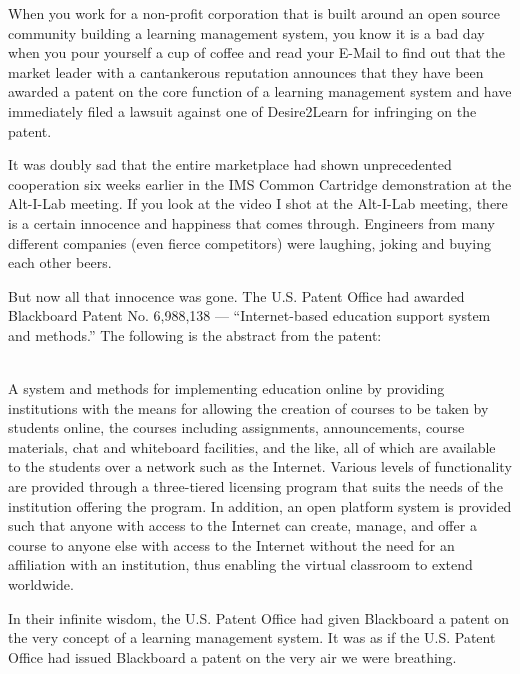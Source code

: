 \documentclass[12pt]{book}
\begin{document}
When you work for a non-profit corporation that is built around an
open source community building a learning management system,
you know it is a bad day when you pour yourself a cup of coffee
and read your E-Mail to find out that the market leader
with a cantankerous reputation announces that they have been
awarded a patent on the core function of a learning management
system and have immediately filed a lawsuit against one of
Desire2Learn for infringing on the patent.

It was doubly sad that the entire marketplace had shown
unprecedented cooperation six weeks earlier in the IMS
Common Cartridge demonstration at the Alt-I-Lab meeting.
If you look at the video I shot at the Alt-I-Lab
meeting, there is a certain innocence and happiness that
comes through.  Engineers from many different companies
(even fierce competitors) were laughing, joking and buying
each other beers.

But now all that innocence was gone. The U.S. Patent Office
had awarded Blackboard Patent No. 6,988,138 --- ``Internet-based education
support system and methods.''  The following is the abstract
from the patent:\\
\\
\begin{sf}
A system and methods for implementing education online by
providing institutions with the means for allowing the creation of
courses to be taken by students online, the courses including
assignments, announcements, course materials, chat and whiteboard
facilities, and the like, all of which are available to the students
over a network such as the Internet. Various levels of functionality
are provided through a three-tiered licensing program that suits the
needs of the institution offering the program. In addition, an open
platform system is provided such that anyone with access to the
Internet can create, manage, and offer a course to anyone else
with access to the Internet without the need for an affiliation
with an institution, thus enabling the virtual classroom to extend worldwide.\\
\end{sf}

In their infinite wisdom, the U.S. Patent Office had given Blackboard a
patent on the very concept of a learning management system.
It was as if the U.S. Patent Office had issued Blackboard a
patent on the very air we were breathing.
\end{document}
